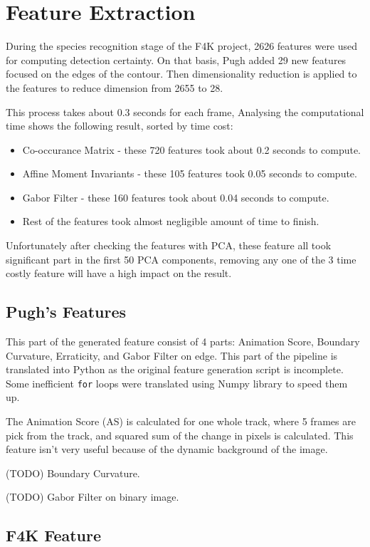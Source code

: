 \documentclass[bsc,logo,twoside,fullspacing,parskip]{infthesis}
\begin{document}
\section{Feature Extraction}

During the species recognition stage of the F4K project, 2626 features were used for computing detection certainty. 
On that basis, Pugh added 29 new features focused on the edges of the contour. Then dimensionality reduction is applied to the features to reduce dimension from 2655 to 28. 

This process takes about 0.3 seconds for each frame, Analysing the computational time shows the following result, sorted by time cost:
\begin{itemize}
\item
Co-occurance Matrix - these 720 features took about 0.2 seconds to compute.
\item
Affine Moment Invariants - these 105 features took 0.05 seconds to compute.
\item
Gabor Filter - these 160 features took about 0.04 seconds to compute.
\item
Rest of the features took almost negligible amount of time to finish.
\end{itemize}
Unfortunately after checking the features with PCA, these feature all took significant part in the first 50 PCA components, removing any one of the 3 time costly feature will have a high impact on the result.

\subsection{Pugh's Features}

This part of the generated feature consist of 4 parts: Animation Score, Boundary Curvature, Erraticity, and Gabor Filter on edge. This part of the pipeline is translated into Python as the original feature generation script is incomplete. Some inefficient {\tt for} loops were translated using Numpy library to speed them up.

The Animation Score (AS) is calculated for one whole track, where 5 frames are pick from the track, and squared sum of the change in pixels is calculated. This feature isn't very useful because of the dynamic background of the image.

(TODO) Boundary Curvature.

(TODO) Gabor Filter on binary image.

\subsection{F4K Feature}
\end{document}
